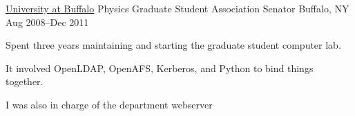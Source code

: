 


\begin{cventries}

  \cventry
    {\href{www.buffalo.edu}{University at Buffalo}}
    {Physics Graduate Student Association Senator}
    {Buffalo, NY} {Aug 2008--Dec 2011}
    {
    \begin{cvitems}
      \item  Spent three years maintaining and starting the graduate student computer lab.
      \item It involved OpenLDAP, OpenAFS, Kerberos, and Python to bind things together.
      \item I was also in charge of the department webserver
    \end{cvitems}
    }


\end{cventries}


